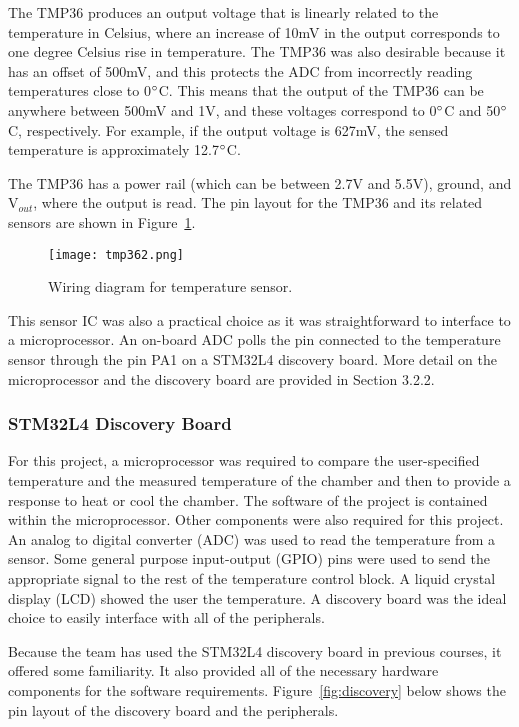 \documentclass[11pt,letter]{article}
\begin{document}
The TMP36 produces an output voltage that is linearly related to the temperature in Celsius, where an increase of 10mV in the output corresponds to one degree Celsius rise in temperature. The TMP36 was also desirable because it has an offset of 500mV, and this protects the ADC from incorrectly reading temperatures close to 0$\degree$C. This means that the output of the TMP36 can be anywhere between 500mV and 1V, and these voltages correspond to 0$\degree$C and 50$\degree$C, respectively. For example, if the output voltage is 627mV, the sensed temperature is approximately 12.7$\degree$C.

The TMP36 has a power rail (which can be between 2.7V and 5.5V), ground, and V$_{out}$, where the output is read. The pin layout for the TMP36 and its related sensors are shown in Figure~\ref{fig:tempsensor}.

\begin{figure}[H]
    \centering
    \texttt{[image: tmp362.png]}
    \caption{Wiring diagram for temperature sensor.}
    \label{fig:tempsensor}
\end{figure}

This sensor IC was also a practical choice as it was straightforward to interface to a microprocessor. An on-board ADC polls the pin connected to the temperature sensor through the pin PA1 on a STM32L4 discovery board. More detail on the microprocessor and the discovery board are provided in Section 3.2.2.

\subsubsection{STM32L4 Discovery Board}

For this project, a microprocessor was required to compare the user-specified temperature and the measured temperature of the chamber and then to provide a response to heat or cool the chamber. The software of the project is contained within the microprocessor. Other components were also required for this project. An analog to digital converter (ADC) was used to read the temperature from a sensor. Some general purpose input-output (GPIO) pins were used to send the appropriate signal to the rest of the temperature control block. A liquid crystal display (LCD) showed the user the temperature. A discovery board was the ideal choice to easily interface with all of the peripherals.

Because the team has used the STM32L4 discovery board in previous courses, it offered some familiarity. It also provided all of the necessary hardware components for the software requirements. Figure~\ref{fig:discovery} below shows the pin layout of the discovery board and the peripherals.
\end{document}
